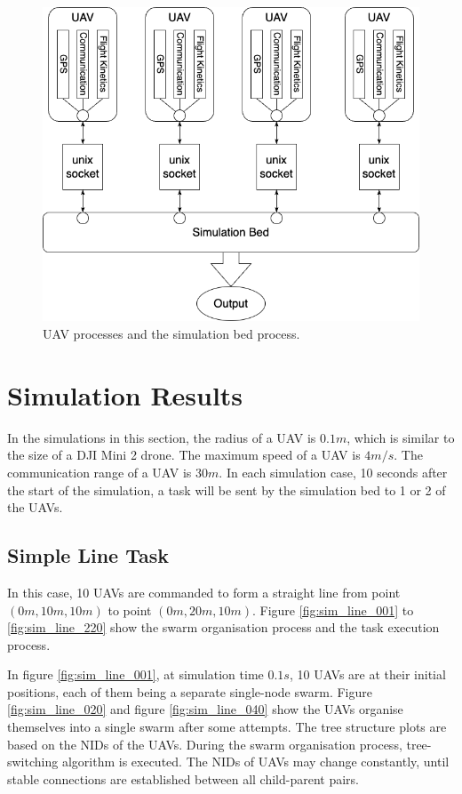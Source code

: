 \begin{figure}[htbp]
  \centering
  \includegraphics[width=0.8\linewidth]{rsc/simbed.png}
  \caption[Simulation bed.]
  {UAV processes and the simulation bed process.}
  \label{fig:simbed}
\end{figure}

\section{Simulation Results}
\label{sec:sim_res}

In the simulations in this section, the radius of a UAV is $0.1m$,
which is similar to the size of a DJI Mini 2 \parencite{DJI2024} drone.
The maximum speed of a UAV is $4m/s$.
The communication range of a UAV is $30m$.
In each simulation case, 10 seconds after the start of the simulation,
a task will be sent by the simulation bed to 1 or 2 of the UAVs.

\subsection{Simple Line Task}

In this case, 10 UAVs are commanded to form a straight line
from point $(0m, 10m, 10m)$ to point $(0m, 20m, 10m)$.
Figure \ref{fig:sim_line_001} to \ref{fig:sim_line_220} show
the swarm organisation process and the task execution process.

In figure \ref{fig:sim_line_001}, at simulation time $0.1s$,
10 UAVs are at their initial positions, each of them being a separate single-node swarm.
Figure \ref{fig:sim_line_020} and figure \ref{fig:sim_line_040} show
the UAVs organise themselves into a single swarm after some attempts.
The tree structure plots are based on the NIDs of the UAVs.
During the swarm organisation process, tree-switching algorithm is executed.
The NIDs of UAVs may change constantly,
until stable connections are established between all child-parent pairs.

